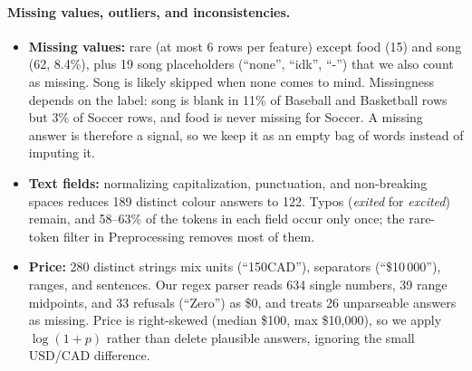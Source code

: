 \documentclass[11pt,titlepage]{article}
\begin{document}
\paragraph{Missing values, outliers, and inconsistencies.}
\begin{itemize}\itemsep0pt
\item \textbf{Missing values:} rare (at most 6 rows per feature) except food (15)
and song (62, 8.4\%), plus 19 song placeholders (``none'', ``idk'', ``-'') that we
also count as missing. Song is likely skipped when none comes to mind. Missingness
depends on the label: song is blank in 11\% of Baseball and Basketball rows but 3\%
of Soccer rows, and food is never missing for Soccer. A missing answer is therefore
a signal, so we keep it as an empty bag of words instead of imputing it.
\item \textbf{Text fields:} normalizing capitalization, punctuation, and
non-breaking spaces reduces 189 distinct colour answers to 122. Typos
(\emph{exited} for \emph{excited}) remain, and 58--63\% of the tokens in each field
occur only once; the rare-token filter in Preprocessing removes most of them.
\item \textbf{Price:} 280 distinct strings mix units (``150CAD''), separators
(``\$10\,000''), ranges, and sentences. Our regex parser reads 634 single
numbers, 39 range midpoints, and 33 refusals (``Zero'') as \$0, and treats 26
unparseable answers as missing. Price is right-skewed (median \$100, max
\$10{,}000), so we apply $\log(1+p)$ rather than delete plausible answers,
ignoring the small USD/CAD difference.
\end{itemize}
\end{document}
